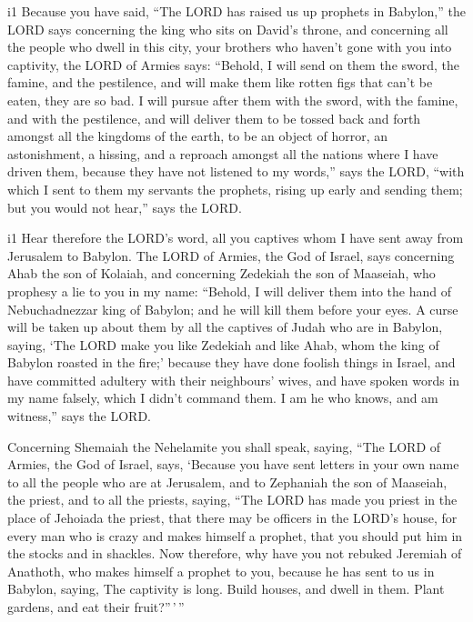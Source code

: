 i1 Because you have said, ``The LORD has raised us up
prophets in Babylon,''  the LORD says concerning the king
who sits on David's throne, and concerning all the people who dwell in
this city, your brothers who haven't gone with you into captivity,
 the LORD of Armies says: ``Behold, I will send on them the
sword, the famine, and the pestilence, and will make them like rotten
figs that can't be eaten, they are so bad.  I will pursue
after them with the sword, with the famine, and with the pestilence, and
will deliver them to be tossed back and forth amongst all the kingdoms
of the earth, to be an object of horror, an astonishment, a hissing, and
a reproach amongst all the nations where I have driven them,
 because they have not listened to my words,'' says the
LORD, ``with which I sent to them my servants the prophets, rising up
early and sending them; but you would not hear,'' says the LORD.

i1 Hear therefore the LORD's word, all you captives whom I
have sent away from Jerusalem to Babylon.  The LORD of
Armies, the God of Israel, says concerning Ahab the son of Kolaiah, and
concerning Zedekiah the son of Maaseiah, who prophesy a lie to you in my
name: ``Behold, I will deliver them into the hand of Nebuchadnezzar king
of Babylon; and he will kill them before your eyes.  A
curse will be taken up about them by all the captives of Judah who are
in Babylon, saying, `The LORD make you like Zedekiah and like Ahab, whom
the king of Babylon roasted in the fire;'  because they
have done foolish things in Israel, and have committed adultery with
their neighbours' wives, and have spoken words in my name falsely, which
I didn't command them. I am he who knows, and am witness,'' says the
LORD.

 Concerning Shemaiah the Nehelamite you shall speak,
saying,  ``The LORD of Armies, the God of Israel, says,
`Because you have sent letters in your own name to all the people who
are at Jerusalem, and to Zephaniah the son of Maaseiah, the priest, and
to all the priests, saying,  ``The LORD has made you priest
in the place of Jehoiada the priest, that there may be officers in the
LORD's house, for every man who is crazy and makes himself a prophet,
that you should put him in the stocks and in shackles.  Now
therefore, why have you not rebuked Jeremiah of Anathoth, who makes
himself a prophet to you,  because he has sent to us in
Babylon, saying, The captivity is long. Build houses, and dwell in them.
Plant gardens, and eat their fruit?''\,'\,''

